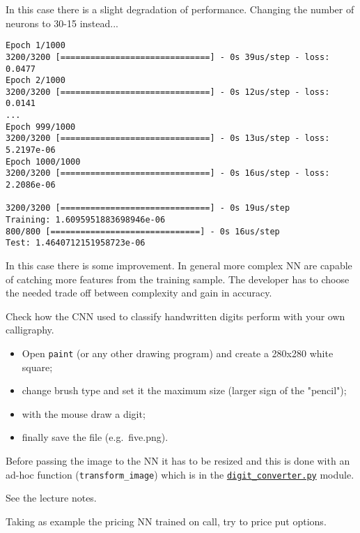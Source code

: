\begin{Answer}
In this case there is a slight degradation of performance.
Changing the number of neurons to 30-15 instead...

\begin{tcolorbox}[size=fbox, boxrule=1pt, colback=cellbackground, colframe=cellborder]
\begin{Verbatim}[commandchars=\\\{\}]
Epoch 1/1000
3200/3200 [==============================] - 0s 39us/step - loss: 0.0477
Epoch 2/1000
3200/3200 [==============================] - 0s 12us/step - loss: 0.0141
...
Epoch 999/1000
3200/3200 [==============================] - 0s 13us/step - loss: 5.2197e-06
Epoch 1000/1000
3200/3200 [==============================] - 0s 16us/step - loss: 2.2086e-06

3200/3200 [==============================] - 0s 19us/step
Training: 1.6095951883698946e-06
800/800 [==============================] - 0s 16us/step
Test: 1.4640712151958723e-06
\end{Verbatim}
\end{tcolorbox}

In this case there is some improvement. In general more complex NN are
capable of catching more features from the training sample. The
developer has to choose the needed trade off between complexity and gain
in accuracy.
\end{Answer}

\begin{Exercise}
Check how the CNN used to classify handwritten digits perform with your own calligraphy.

\begin{itemize}
\tightlist
\item
  Open \texttt{paint} (or any other drawing program) and create a 280x280 white square;
\item
  change brush type and set it the maximum size (larger sign of the "pencil");
\item
  with the mouse draw a digit;
\item
  finally save the file (e.g.~five.png).
\end{itemize}

Before passing the image to the NN it has to be resized and this is done
with an ad-hoc function (\texttt{transform\_image}) which is in the
\href{https://drive.google.com/file/d/1FMYvOJDDOdIv7kDb2VIGhAkNNmReiOb_/view?usp=sharing}{\texttt{digit\_converter.py}} module.
\end{Exercise}
\begin{Answer}
See the lecture notes.
\end{Answer}

\begin{Exercise}
Taking as example the pricing NN trained on call, try to price put
options.
\end{Exercise}
\begin{Answer}
\end{Answer}
